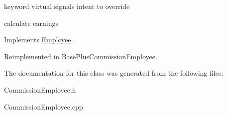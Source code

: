 keyword virtual signals intent to override 

calculate earnings 

Implements \mbox{\hyperlink{class_employee_a821a8bea1db657efc004670c8481cbae}{Employee}}.



Reimplemented in \mbox{\hyperlink{class_base_plus_commission_employee_a79cefc4722f05de0e545c2f911e2dcab}{Base\+Plus\+Commission\+Employee}}.



The documentation for this class was generated from the following files\+:\begin{DoxyCompactItemize}
\item 
Commission\+Employee.\+h\item 
Commission\+Employee.\+cpp\end{DoxyCompactItemize}
